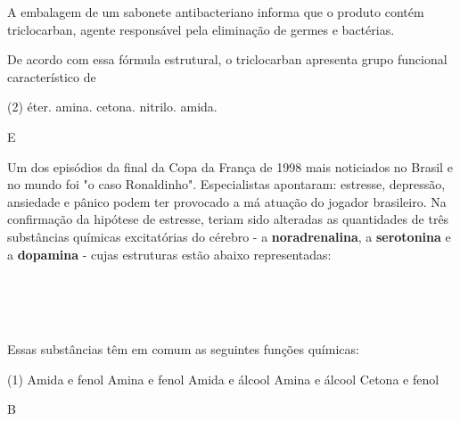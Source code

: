 \documentclass[11pt]{scrartcl}
\begin{document}
\begin{exercise}[points=1.0]
A embalagem de um sabonete antibacteriano informa que o produto contém triclocarban, agente responsável pela eliminação de germes e bactérias.

\vspace{.5cm}
\centerline{
}
\vspace{.3cm}


De acordo com essa fórmula estrutural, o triclocarban apresenta grupo funcional característico de


\begin{choice}(2)
\choice éter.
\choice amina.
\choice cetona.
\choice nitrilo.
\choice amida.
\end{choice}
\end{exercise}
\begin{solution}
E
\end{solution}





\begin{exercise}[points=1.0]
Um dos episódios da final da Copa da França de 1998 mais noticiados no Brasil e no mundo foi "o caso Ronaldinho". Especialistas apontaram: estresse, depressão, ansiedade e pânico podem ter provocado a má atuação do jogador brasileiro. Na confirmação da hipótese de estresse, teriam sido alteradas as quantidades de três substâncias químicas excitatórias do cérebro - a \textbf{noradrenalina}, a \textbf{serotonina} e a \textbf{dopamina} - cujas estruturas estão abaixo representadas:
\vspace{.3cm}
\begin{center}
\\
\\
\\
\end{center}
\vspace{.3cm}

Essas substâncias têm em comum as seguintes funções químicas:

\begin{choice}(1)
\choice Amida e fenol
\choice Amina e fenol
\choice Amida e álcool
\choice Amina e álcool
\choice Cetona e fenol
\end{choice}
\end{exercise}
\begin{solution}
B
\end{solution}
\end{document}
